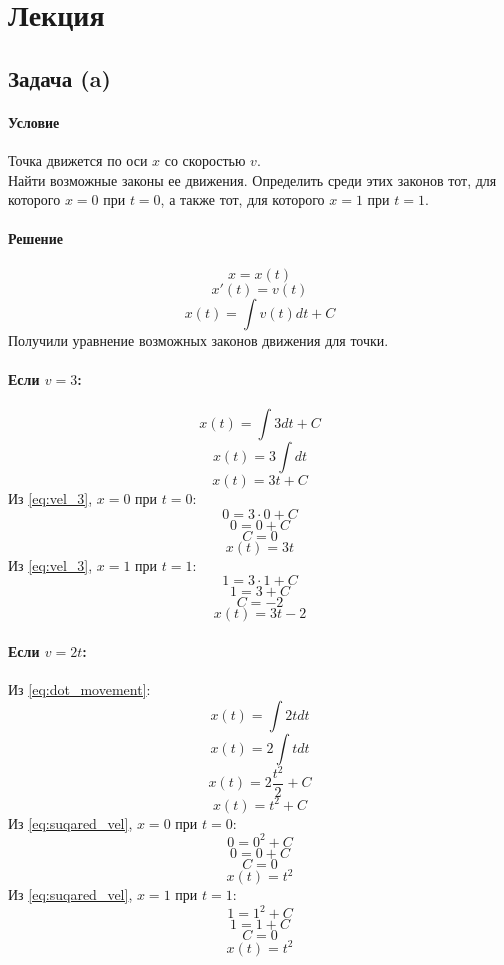 \section{Лекция}

\subsection{Задача (a)}
\paragraph{Условие}
Точка движется по оси $x$ со скоростью $v$.\\
Найти возможные законы ее движения. Определить среди этих законов тот, для которого $x = 0$ при $t = 0$, а также тот, для которого $x = 1$ при $t = 1$. 
\paragraph{Решение}
\[x = x(t)\]
\begin{equation}
  x'(t) = v(t)
  \label{eq:dot_movement}
\end{equation}
\[x(t) = \int v(t)dt + C\]
Получили уравнение возможных законов движения для точки.
\paragraph{Если $v = 3$:}
\[x(t) = \int 3dt + C\]
\[x(t) = 3\int dt\]
\begin{equation}
  x(t) = 3t + C
  \label{eq:vel_3}
\end{equation}
Из \ref{eq:vel_3}, $x = 0$ при $t = 0$:
\[0 = 3 \cdot 0 + C\]
\[0 = 0 + C\]
\[C = 0\]
\[x(t) = 3t\]
Из \ref{eq:vel_3}, $x = 1$ при $t = 1$:
\[1 = 3 \cdot 1 + C\]
\[1 = 3 + C\]
\[C = -2\]
\[x(t) = 3t - 2\]
\paragraph{Если $v = 2t$:}
Из \ref{eq:dot_movement}:
\[x(t) = \int 2t dt\]
\[x(t) = 2 \int t dt\]
\[x(t) = 2 \frac{t^2}{2} + C\]
\begin{equation}
  x(t) = t^2 + C
  \label{eq:suqared_vel}
\end{equation}
Из \ref{eq:suqared_vel}, $x = 0$ при $t = 0$:
\[0 = 0^2 + C\]
\[0 = 0 + C\]
\[C = 0\]
\[x(t) = t^2\]
Из \ref{eq:suqared_vel}, $x = 1$ при $t = 1$:
\[1 = 1^2 + C\]
\[1 = 1 + C\]
\[C = 0\]
\[x(t) = t^2\]
